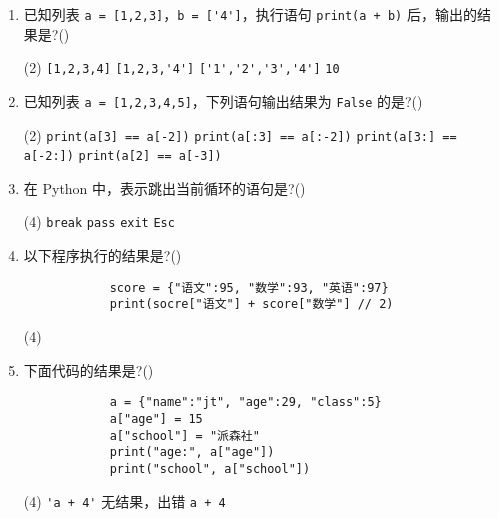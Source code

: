 \documentclass[11pt]{ctexart}
\begin{document}
\begin{enumerate}
        \item 已知列表 \lstinline{a = [1,2,3]}，\lstinline{b = ['4']}，执行语句 \lstinline{print(a + b)} 后，输出的结果是?(\qquad)
        \begin{tasks}(2)
            \task \lstinline{[1,2,3,4]}
            \task \lstinline{[1,2,3,'4']}
            \task \lstinline{['1','2','3','4']}
            \task \lstinline{10}
        \end{tasks}

        \item 已知列表 \lstinline{a = [1,2,3,4,5]}，下列语句输出结果为 \lstinline{False} 的是?(\qquad)
        \begin{tasks}(2)
            \task \lstinline{print(a[3] == a[-2])}
            \task \lstinline{print(a[:3] == a[:-2])}
            \task \lstinline{print(a[3:] == a[-2:])}
            \task \lstinline{print(a[2] == a[-3])}
        \end{tasks}

        \item 在 Python 中，表示跳出当前循环的语句是?(\qquad)
        \begin{tasks}(4)
            \task \lstinline{break}
            \task \lstinline{pass}
            \task \lstinline{exit}
            \task \lstinline{Esc}
        \end{tasks}

        \item 以下程序执行的结果是?(\qquad)
        \begin{lstlisting}
            score = {"语文":95, "数学":93, "英语":97}
            print(socre["语文"] + score["数学"] // 2)
        \end{lstlisting}
        \begin{tasks}(4)
        \end{tasks}

        \item 下面代码的结果是?(\qquad)
        \begin{lstlisting}
            a = {"name":"jt", "age":29, "class":5}
            a["age"] = 15
            a["school"] = "派森社"
            print("age:", a["age"])
            print("school", a["school"])
        \end{lstlisting}
        \begin{tasks}(4)
            \task \lstinline{'a + 4'}
            \task 无结果，出错
            \task \lstinline{a + 4}
        \end{tasks}


\end{enumerate}
\end{document}
